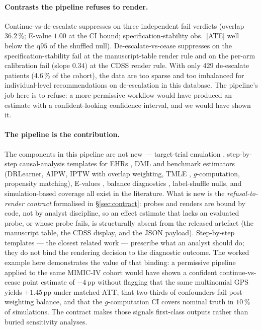 \documentclass[11pt,a4paper]{article}
\begin{document}
\paragraph{Contrasts the pipeline refuses to render.} Continue-vs-de-escalate suppresses on three independent fail verdicts (overlap $36.2\,\%$; E-value $1.00$ at the CI bound; specification-stability obs.\ $|$ATE$|$ well below the q$95$ of the shuffled null). De-escalate-vs-cease suppresses on the specification-stability fail at the manuscript-table render rule and on the per-arm calibration fail (slope $0.34$) at the CDSS render rule. With only 429 de-escalate patients (4.6\,\% of the cohort), the data are too sparse and too imbalanced for individual-level recommendations on de-escalation in this database. The pipeline's job here is to refuse: a more permissive workflow would have produced an estimate with a confident-looking confidence interval, and we would have shown it.

\paragraph{The pipeline is the contribution.} The components in this pipeline are not new --- target-trial emulation \cite{hernan2016target}, step-by-step causal-analysis templates for EHRs \cite{doutreligne2024stepbystep}, DML \cite{chernozhukov2018dml} and benchmark estimators (DRLearner, AIPW, IPTW with overlap weighting, TMLE \cite{vanderlaan2011tmle}, $g$-computation, propensity matching), E-values \cite{vanderweele2017evalue}, balance diagnostics \cite{austin2009smd}, label-shuffle nulls, and simulation-based coverage all exist in the literature. What is new is the \emph{refusal-to-render contract} formalised in \S\ref{sec:contract}: probes and renders are bound by code, not by analyst discipline, so an effect estimate that lacks an evaluated probe, or whose probe fails, is structurally absent from the released artefact (the manuscript table, the CDSS display, and the JSON payload). Step-by-step templates --- the closest related work --- prescribe what an analyst should do; they do not bind the rendering decision to the diagnostic outcome. The worked example here demonstrates the value of that binding: a permissive pipeline applied to the same MIMIC-IV cohort would have shown a confident continue-vs-cease point estimate of $-4$\,pp without flagging that the same multinomial GPS yields $+1.45$\,pp under matched-ATT, that two-thirds of confounders fail post-weighting balance, and that the $g$-computation CI covers nominal truth in $10\,\%$ of simulations. The contract makes those signals first-class outputs rather than buried sensitivity analyses.
\end{document}
